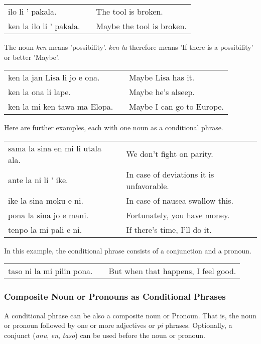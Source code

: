\begin{supertabular}{p{5,5cm}|ll}
    ilo li ' pakala.        &  & The tool is broken.       \\
    ken la ilo li ' pakala. &  & Maybe the tool is broken. \\
\end{supertabular}

The noun \textit{ken} means 'possibility'.
\textit{ken la} therefore means 'If there is a possibility' or better 'Maybe'.

\begin{supertabular}{p{5,5cm}|ll}
    ken la jan Lisa li jo e ona. &  & Maybe Lisa has it.        \\
    ken la ona li lape.          &  & Maybe he's alseep.        \\
    ken la mi ken tawa ma Elopa. &  & Maybe I can go to Europe. \\
\end{supertabular}

Here are further examples, each with one noun as a conditional phrase.

\begin{supertabular}{p{5,5cm}|ll}
    sama la sina en mi li utala ala. &  & We don't fight on parity.                \\
    ante la ni li ' ike.             &  & In case of deviations it is unfavorable. \\
    ike la sina moku e ni.           &  & In case of nausea swallow this.          \\
    pona la sina jo e mani.          &  & Fortunately, you have money.             \\
    tenpo la mi pali e ni.           &  & If there's time, I'll do it.             \\

\end{supertabular}

In this example, the conditional phrase consists of a conjunction and a pronoun.

\begin{supertabular}{p{5,5cm}|ll}
    taso ni la mi pilin pona. &  & But when that happens, I feel good. \\
\end{supertabular}

%
%
\subsubsection*{Composite Noun or Pronouns as Conditional Phrases}
%
%
A conditional phrase can be also a composite noun or Pronoun.
That is, the noun or pronoun followed by one or more adjectives or \textit{pi} phrases.
Optionally, a conjunct (\textit{anu}, \textit{en}, \textit{taso}) can be used before the noun or pronoun.

